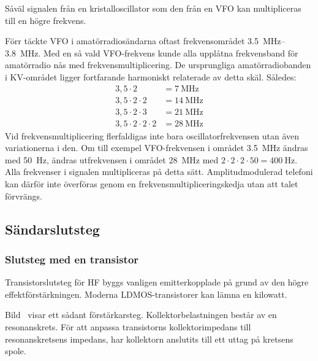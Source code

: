 Såväl signalen från en kristalloscillator som den från en VFO kan
multipliceras till en högre frekvens.

Förr täckte VFO i amatörradiosändarna oftast frekvensområdet
\SIrange{3,5}{3,8}{\mega\hertz}.
Med en så vald VFO-frekvens kunde alla upplåtna frekvensband för
amatörradio nås med frekvensmultiplicering.
De ursprungliga amatörradiobanden i KV-området ligger fortfarande harmoniskt
relaterade av detta skäl. Således:
\begin{align*}
  3,5 \cdot 2 & = \qty{7}{\mega\hertz} \\
  3,5 \cdot 2 \cdot 2 & = \qty{14}{\mega\hertz} \\
  3,5 \cdot 2 \cdot 3 & = \qty{21}{\mega\hertz} \\
  3,5 \cdot 2 \cdot 2 \cdot 2 & = \qty{28}{\mega\hertz}
\end{align*}
Vid frekvensmultiplicering flerfaldigas inte bara oscillatorfrekvensen utan
även variationerna i den.
Om till exempel VFO-frekvensen i området \qty{3,5}{\mega\hertz} ändras med
\qty{50}{\hertz}, ändras utfrekvensen i området \qty{28}{\mega\hertz} med
\(2 \cdot 2 \cdot 2 \cdot 50 = \qty{400}{\hertz}\).
Alla frekvenser i signalen multipliceras på detta sätt.
Amplitudmodulerad telefoni kan därför inte överföras genom en
frekvensmultipliceringskedja utan att talet förvrängs.

\subsection{Sändarslutsteg}

\subsubsection{Slutsteg med en transistor}


Transistorslutsteg för HF byggs vanligen emitterkopplade på grund av den
högre effektförstärkningen.
Moderna LDMOS-transistorer kan lämna en kilowatt.

Bild~ visar ett sådant förstärkarsteg.
Kollektorbelastningen består av en resonanskrets.
För att anpassa transistorns kollektorimpedans till resonanskretsens
impedans, har kollektorn anslutits till ett uttag på kretsens spole.

